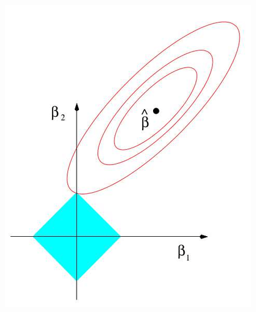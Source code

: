 \documentclass[12pt, aspectratio = 169]{beamer}
\begin{document}
\begin{frame}[t]
\begin{columns}[t]
		\centering
		\includegraphics[width=0.4\linewidth]{lasso}
	\end{columns}
\end{frame}

\end{document}
